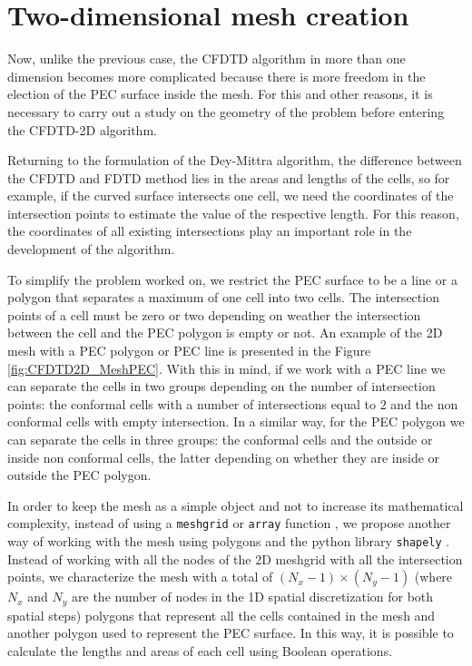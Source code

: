 \documentclass[12pt, oneside]{book}
\begin{document}
\section{Two-dimensional mesh creation}

Now, unlike the previous case, the CFDTD algorithm in more than one dimension becomes more complicated because there is more freedom in the election of the PEC surface inside the mesh. For this and other reasons, it is necessary to carry out a study on the geometry of the problem before entering the CFDTD-2D algorithm.

Returning to the formulation of the Dey-Mittra algorithm, the difference between the CFDTD and FDTD method lies in the areas and lengths of the cells, so for example, if the curved surface intersects one cell, we need the coordinates of the intersection points to estimate the value of the respective length. For this reason, the coordinates of all existing intersections play an important role in the development of the algorithm.

To simplify the problem worked on, we restrict the PEC surface to be a line or a polygon that separates a maximum of one cell into two cells. The intersection points of a cell must be zero or two depending on weather the intersection between the cell and the PEC polygon is empty or not. An example of the 2D mesh with a PEC polygon or PEC line is presented in the Figure \ref{fig:CFDTD2D_MeshPEC}. With this in mind, if we work with a PEC line we can separate the cells in two groups depending on the number of intersection points: the conformal cells with a number of intersections equal to $2$ and the non conformal cells with empty intersection. In a similar way, for the PEC polygon we can separate the cells in three groups: the conformal cells and the outside or inside non conformal cells, the latter depending on whether they are inside or outside the PEC polygon.

In order to keep the mesh as a simple object and not to increase its mathematical complexity, instead of using a \texttt{meshgrid} or \texttt{array} function \cite{harris2020array}, we propose another way of working with the mesh using polygons and the python library \texttt{shapely} \cite{Gillies_Shapely_2024}. Instead of working with all the nodes of the 2D meshgrid with all the intersection points, we characterize the mesh with a total of $(N_x - 1) \times (N_y - 1)$ (where $N_x$ and $N_y$ are the number of nodes in the 1D spatial discretization for both spatial steps) polygons that represent all the cells contained in the mesh and another polygon used to represent the PEC surface. In this way, it is possible to calculate the lengths and areas of each cell using Boolean operations. 
\end{document}
